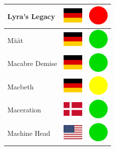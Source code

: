 \documentclass[12pt, a4paper, twoside]{report}
\begin{document}
\begin{center}
\begin{longtable}{|p{5cm}|p{2cm}|p{2cm}|}
 Lyra's Legacy                                              & \includegraphics[width=1cm]{../4x3/de} &   \includegraphics[width=1cm]{../likes/n} \\ \hline
 Määt                                                       & \includegraphics[width=1cm]{../4x3/de} &   \includegraphics[width=1cm]{../likes/y} \\ \hline
 Macabre Demise                                             & \includegraphics[width=1cm]{../4x3/de} &   \includegraphics[width=1cm]{../likes/y} \\ \hline
 Macbeth                                                    & \includegraphics[width=1cm]{../4x3/de} &   \includegraphics[width=1cm]{../likes/m} \\ \hline
 Maceration                                                 & \includegraphics[width=1cm]{../4x3/dk} &   \includegraphics[width=1cm]{../likes/y} \\ \hline
 Machine Head                                               & \includegraphics[width=1cm]{../4x3/us} &   \includegraphics[width=1cm]{../likes/y} \\ \hline

\end{longtable}
\end{center}
\end{document}
